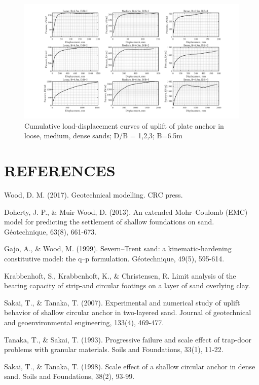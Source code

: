\documentclass[a4paper, nobind]{templates/ociamthesis}
\begin{document}
\begin{landscape}
\begin{figure}[H]
\includegraphics[width=1\linewidth]{myfigureeeeee/CodeG} \caption{Cumulative load-displacement curves of uplift of plate anchor in loose, medium, dense sands; D/B = 1,2,3; B=6.5m}\label{fig:unnamed-chunk-53}
\end{figure}

\end{landscape}

\hypertarget{references}{%
\chapter{REFERENCES}\label{references}}

Wood, D. M. (2017). Geotechnical modelling. CRC press.

Doherty, J. P., \& Muir Wood, D. (2013). An extended Mohr--Coulomb (EMC) model for predicting the settlement of shallow foundations on sand. Géotechnique, 63(8), 661-673.

Gajo, A., \& Wood, M. (1999). Severn--Trent sand: a kinematic-hardening constitutive model: the q--p formulation. Géotechnique, 49(5), 595-614.

Krabbenhoft, S., Krabbenhoft, K., \& Christensen, R. Limit analysis of the bearing capacity of strip-and circular footings on a layer of sand overlying clay.

Sakai, T., \& Tanaka, T. (2007). Experimental and numerical study of uplift behavior of shallow circular anchor in two-layered sand. Journal of geotechnical and geoenvironmental engineering, 133(4), 469-477.

Tanaka, T., \& Sakai, T. (1993). Progressive failure and scale effect of trap-door problems with granular materials. Soils and Foundations, 33(1), 11-22.

Sakai, T., \& Tanaka, T. (1998). Scale effect of a shallow circular anchor in dense sand. Soils and Foundations, 38(2), 93-99.
\end{document}
